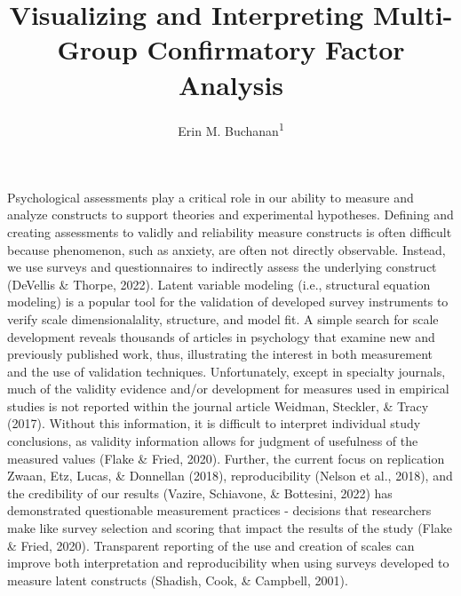 \documentclass[
  man]{apa6}
\title{Visualizing and Interpreting Multi-Group Confirmatory Factor Analysis}
\author{Erin M. Buchanan\textsuperscript{1}}
\date{}
\affiliation{\vspace{0.5cm}\textsuperscript{1} Harrisburg University of Science and Technology}
\begin{document}
\maketitle

Psychological assessments play a critical role in our ability to measure and analyze constructs to support theories and experimental hypotheses. Defining and creating assessments to validly and reliability measure constructs is often difficult because phenomenon, such as anxiety, are often not directly observable. Instead, we use surveys and questionnaires to indirectly assess the underlying construct (DeVellis \& Thorpe, 2022). Latent variable modeling (i.e., structural equation modeling) is a popular tool for the validation of developed survey instruments to verify scale dimensionalality, structure, and model fit. A simple search for scale development reveals thousands of articles in psychology that examine new and previously published work, thus, illustrating the interest in both measurement and the use of validation techniques. Unfortunately, except in specialty journals, much of the validity evidence and/or development for measures used in empirical studies is not reported within the journal article Weidman, Steckler, \& Tracy (2017). Without this information, it is difficult to interpret individual study conclusions, as validity information allows for judgment of usefulness of the measured values (Flake \& Fried, 2020). Further, the current focus on replication Zwaan, Etz, Lucas, \& Donnellan (2018), reproducibility (Nelson et al., 2018), and the credibility of our results (Vazire, Schiavone, \& Bottesini, 2022) has demonstrated questionable measurement practices - decisions that researchers make like survey selection and scoring that impact the results of the study (Flake \& Fried, 2020). Transparent reporting of the use and creation of scales can improve both interpretation and reproducibility when using surveys developed to measure latent constructs (Shadish, Cook, \& Campbell, 2001).
\end{document}
